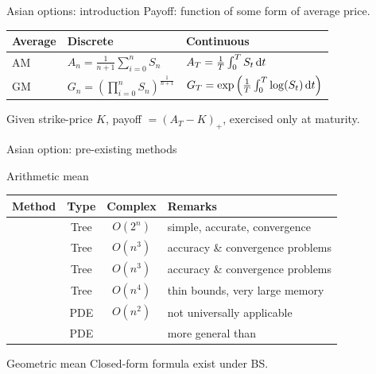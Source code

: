 \documentclass[utf8,t,compress,xcolor=svgnames,handout]{beamer}
\begin{document}
	\begin{frame}{Asian options: introduction}
		Payoff: function of some form of average price.
		
		\bigskip
		
		\begin{tabular}{lll}
			\toprule
			Average  &  Discrete  &  Continuous  \\
			\midrule
			AM  &  $ A_n = \frac{1}{n+1} \sum_{i=0}^{n} S_n $  &  $ A_T = \frac{1}{T} \int_{0}^{T} S_t \dif t $  \\
			GM  &  $ G_n = \left( \prod_{i=0}^{n} S_n \right)^{\frac{1}{n+1}} $  &  $  
			G_T = \exp \left(  \frac{1}{T} \int_{0}^{T} \log(S_t) \dif t  \right) $  \\
			\bottomrule
		\end{tabular}
		
		\bigskip
		
		\begin{example}
			Given strike-price $ K $, payoff $ = (A_T - K)_+ $, exercised only at maturity.
		\end{example}	
	\end{frame}
	
	
	\begin{frame}{Asian option: pre-existing methods}
		\begin{block}{Arithmetic mean}
			\begin{tabular}{cccl}
				\toprule
				Method  &  Type  &  Complex  &  Remarks  \\
				\midrule
				\cite{Cox1979}  &  Tree  &  \alert{$ O(2^n) $}  &  simple, accurate, convergence  \\
				\cite{Hull1993}  &  Tree  &  $ O(n^3) $  &  accuracy \& convergence problems  \\
				\cite{Barraquand1996}  &  Tree  &  $ O(n^3) $  &  accuracy \& convergence problems  \\
				\cite{Chalasani1999}  &  Tree  &  $ O(n^4) $  &  thin bounds, very large memory  \\
				\cite{Vecer2001}  &  PDE  &  $ O(n^2) $  &  not universally applicable  \\
				\cite{dHalluin2005}  &  PDE  &    &  more general than \cite{Vecer2001} \\
				\bottomrule
			\end{tabular}
		\end{block}
		
		\bigskip
		
		\begin{block}{Geometric mean}
			Closed-form formula exist under BS.
		\end{block}
	\end{frame}
	
\end{document}
